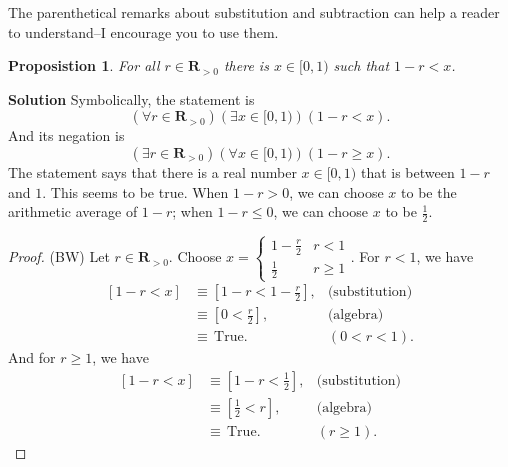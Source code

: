 \documentclass[12pt,fleqn,answers]{exam}
\newcommand{\reals}{\mathbf{R}}
\newcommand{\true}{\, \mathrm{True}}
\newenvironment{myproof}
  {\begin{shaded}\begin{proof}}
  {\end{proof}\end{shaded}}
\newtheorem{prop}{Proposistion}
\begin{document}
     The parenthetical remarks about substitution and subtraction can
     help a reader to understand--I encourage you to use them.
     
     \begin{prop} 
     For all $r \in \reals_{>0}$ there is $x \in [0,1)$ such that $1-r < x$. 
     \end{prop}

    \noindent \textbf{Solution} Symbolically, the statement is 
    \begin{equation*}
      \left(\forall r \in \reals_{>0}\right)\left(\exists x \in [0,1)\right)\left(1-r < x\right).
    \end{equation*}
    And its negation is 
     \begin{equation*}
       \left(\exists r \in \reals_{>0}\right)\left(\forall x \in [0,1)\right)\left(1-r \geq  x\right).
    \end{equation*}
     The statement says that there is a real number $x \in [0,1)$ that is between $1-r$ and $1$. This seems
     to be true. When $1-r > 0$, we can choose $x$ to be the arithmetic average of $1-r$; when $1-r \leq 0$,
     we can choose $x$ to be $\frac{1}{2}$.
     
      \begin{myproof} (BW) Let $r \in \reals_{>0}$. Choose $x = \begin{cases} 1 - \frac{r}{2}  & r < 1 \\ \frac{1}{2} & r \geq 1 \end{cases}$. For $r < 1$, we have
      \begin{align*}
       \left[1-r < x \right] &\equiv \left[1-r < 1 - \frac{r}{2}  \right], & \mbox{(substitution)} \\
                                  &\equiv  \left[0 <  \frac{r}{2}  \right], & \mbox{(algebra)} \\
                                  &\equiv \true.   &(0 < r < 1).
      \end{align*}
      And for $r \geq 1$, we have
       \begin{align*}
       \left[1-r < x \right] &\equiv \left[1-r < \frac{1}{2}  \right], & \mbox{(substitution)} \\
                                  &\equiv  \left[\frac{1}{2}  <  r  \right], & \mbox{(algebra)} \\
                                  &\equiv \true.   &(r \geq 1).
      \end{align*}
      \end{myproof}
     
\end{document}
